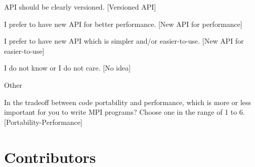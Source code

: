 \documentclass[preprint,5p,times]{elsarticle}
\def\Countries{Contributors\xspace{}}%
\begin{document}
{{\begin{description}
\begin{inparaenum}[{\bf C}1)]
    \item API should be clearly versioned. [Versioned API]
    \item I prefer to have new API for better performance. [New API for performance]
    \item I prefer to have new API which is simpler and/or
      easier-to-use. [New API for easier-to-use]
    \item I do not know or I do not care. [No idea]
    \item Other
    \end{inparaenum}
  \item[Q29:] In the tradeoff between code portability and performance,
    which is more or less important for you to write MPI programs?
    Choose one in the range of 1 to 6. [Portability-Performance]
  \end{description}
}

\section{\Countries}
\label{app:countries}

}
\end{document}
